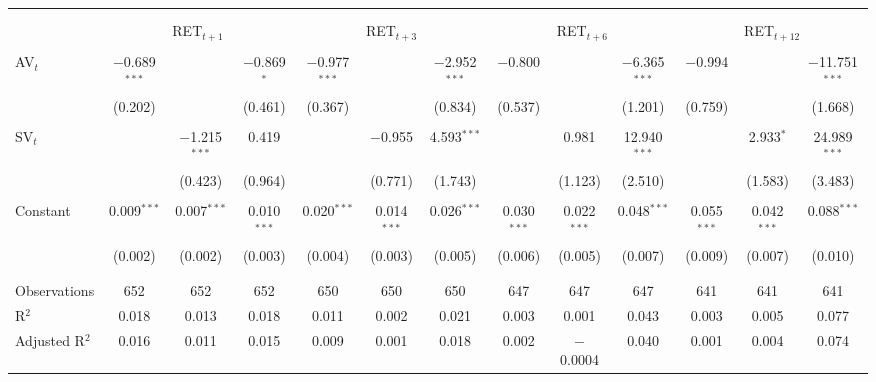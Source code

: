 
	\begin{tabular}{@{\extracolsep{5pt}}lcccccccccccc} 
		\\[-1.8ex]\hline 
		\hline \\[-1.8ex] 
		\\[-1.8ex] & \multicolumn{3}{c}{RET$_{t+1}$} & \multicolumn{3}{c}{RET$_{t+3}$} & \multicolumn{3}{c}{RET$_{t+6}$} & \multicolumn{3}{c}{RET$_{t+12}$} \\ 
		\hline \\[-1.8ex] 
		AV$_{t}$ & $-$0.689$^{***}$ &  & $-$0.869$^{*}$ & $-$0.977$^{***}$ &  & $-$2.952$^{***}$ & $-$0.800 &  & $-$6.365$^{***}$ & $-$0.994 &  & $-$11.751$^{***}$ \\ 
		& (0.202) &  & (0.461) & (0.367) &  & (0.834) & (0.537) &  & (1.201) & (0.759) &  & (1.668) \\ 
		& & & & & & & & & & & & \\ 
		SV$_{t}$ &  & $-$1.215$^{***}$ & 0.419 &  & $-$0.955 & 4.593$^{***}$ &  & 0.981 & 12.940$^{***}$ &  & 2.933$^{*}$ & 24.989$^{***}$ \\ 
		&  & (0.423) & (0.964) &  & (0.771) & (1.743) &  & (1.123) & (2.510) &  & (1.583) & (3.483) \\ 
		& & & & & & & & & & & & \\ 
		Constant & 0.009$^{***}$ & 0.007$^{***}$ & 0.010$^{***}$ & 0.020$^{***}$ & 0.014$^{***}$ & 0.026$^{***}$ & 0.030$^{***}$ & 0.022$^{***}$ & 0.048$^{***}$ & 0.055$^{***}$ & 0.042$^{***}$ & 0.088$^{***}$ \\ 
		& (0.002) & (0.002) & (0.003) & (0.004) & (0.003) & (0.005) & (0.006) & (0.005) & (0.007) & (0.009) & (0.007) & (0.010) \\ 
		& & & & & & & & & & & & \\ 
		\hline \\[-1.8ex] 
		Observations & 652 & 652 & 652 & 650 & 650 & 650 & 647 & 647 & 647 & 641 & 641 & 641 \\ 
		R$^{2}$ & 0.018 & 0.013 & 0.018 & 0.011 & 0.002 & 0.021 & 0.003 & 0.001 & 0.043 & 0.003 & 0.005 & 0.077 \\ 
		Adjusted R$^{2}$ & 0.016 & 0.011 & 0.015 & 0.009 & 0.001 & 0.018 & 0.002 & $-$0.0004 & 0.040 & 0.001 & 0.004 & 0.074 \\ 

\end{tabular}

